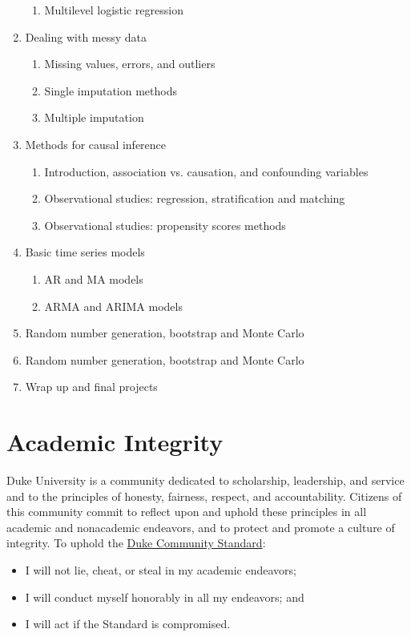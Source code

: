 \documentclass[11pt, a4paper]{article}
\begin{document}
\begin{enumerate}[label= {\color{darkblue}{\ArrowBoldRightStrobe}}]
\begin{enumerate}[label= {\color{cyan}{\Rectangle}}]
		\item Multilevel logistic regression
	\end{enumerate}
	\item Dealing with messy data
	\begin{enumerate}[label= {\color{cyan}{\Rectangle}}]
		\item Missing values, errors, and outliers
		\item Single imputation methods
		\item Multiple imputation
	\end{enumerate}
	\item Methods for causal inference
	\begin{enumerate}[label= {\color{cyan}{\Rectangle}}]
		\item Introduction, association vs. causation, and confounding variables
		\item Observational studies: regression, stratification and matching
		\item Observational studies: propensity scores methods
	\end{enumerate}
	\item Basic time series models
	\begin{enumerate}[label= {\color{cyan}{\Rectangle}}]
		\item AR and MA models
		\item ARMA and ARIMA models
	\end{enumerate}
	\item Random number generation, bootstrap and Monte Carlo
	\item Random number generation, bootstrap and Monte Carlo
	\item Wrap up and final projects
\end{enumerate}


\section{Academic Integrity}  
Duke University is a community dedicated to scholarship, leadership, and service and to the principles of honesty, fairness, respect, and accountability. Citizens of this community commit to reflect upon and uphold these principles in all academic and nonacademic endeavors, and to protect and promote a culture of integrity. To uphold the \href{https://studentaffairs.duke.edu/conduct/about-us/duke-community-standard}{Duke Community Standard}:
\begin{itemize}[label= {\color{darkred}{\Large \HandRight}}]
	\item I will not lie, cheat, or steal in my academic endeavors;
	\item I will conduct myself honorably in all my endeavors; and
	\item I will act if the Standard is compromised.
\end{itemize}
\end{document}
